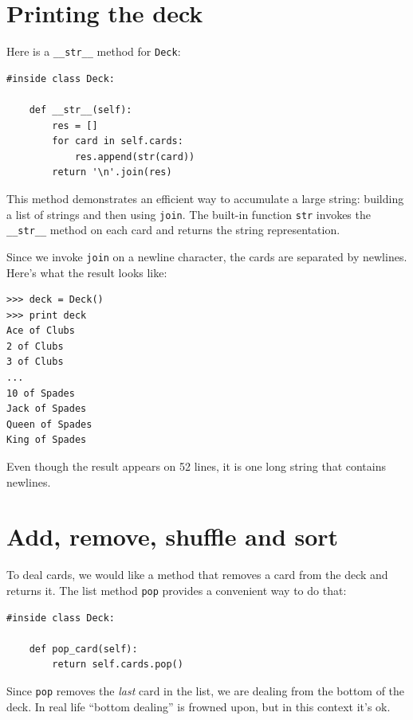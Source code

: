 \documentclass[10pt]{book}
\begin{document}
\section{Printing the deck}
\label{printdeck}

Here is a \verb"__str__" method for {\tt Deck}:

\begin{verbatim}
#inside class Deck:

    def __str__(self):
        res = []
        for card in self.cards:
            res.append(str(card))
        return '\n'.join(res)
\end{verbatim}
%
This method demonstrates an efficient way to accumulate a large
string: building a list of strings and then using {\tt join}.
The built-in function {\tt str} invokes the \verb"__str__"
method on each card and returns the string representation.

Since we invoke {\tt join} on a newline character, the cards
are separated by newlines.  Here's what the result looks like:

\begin{verbatim}
>>> deck = Deck()
>>> print deck
Ace of Clubs
2 of Clubs
3 of Clubs
...
10 of Spades
Jack of Spades
Queen of Spades
King of Spades
\end{verbatim}
%
Even though the result appears on 52 lines, it is
one long string that contains newlines.


\section{Add, remove, shuffle and sort}

To deal cards, we would like a method that
removes a card from the deck and returns it.
The list method {\tt pop} provides a convenient way to do that:

\begin{verbatim}
#inside class Deck:

    def pop_card(self):
        return self.cards.pop()
\end{verbatim}
%
Since {\tt pop} removes the {\em last} card in the list, we are
dealing from the bottom of the deck.  In real life ``bottom dealing'' is
frowned upon,
but in this context it's ok.
\end{document}

